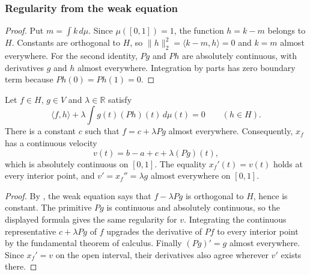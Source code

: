\subsubsection{Regularity from the weak equation}
\label{sec:variational-regularity}

\begin{proof}
Put $m=\int k\,d\mu$. Since $\mu([0,1])=1$, the function
$h=k-m$ belongs to $H$. Constants are orthogonal to $H$, so
$\lVert h\rVert_2^2=\langle k-m,h\rangle=0$ and $k=m$
almost everywhere. For the second identity, $Pg$ and $Ph$ are
absolutely continuous, with derivatives $g$ and $h$ almost
everywhere. Integration by parts has zero boundary term because
$Ph(0)=Ph(1)=0$.
\end{proof}

\begin{theorem}
\label{thm:variational-regularity}
Let $f\in H$, $g\in V$ and $\lambda\in\mathbb R$ satisfy
\[
 \langle f,h\rangle+\lambda\int g(t)(Ph)(t)\,d\mu(t)=0
 \qquad(h\in H).
\]
There is a constant $c$ such that $f=c+\lambda Pg$ almost
everywhere. Consequently, $x_f$ has a continuous velocity
\[
 v(t)=b-a+c+\lambda(Pg)(t),
\]
which is absolutely continuous on $[0,1]$. The equality
$x_f'(t)=v(t)$ holds at every interior point, and
$v'=x_f''=\lambda g$ almost everywhere on $[0,1]$.
\end{theorem}
\begin{proof}
By , the weak equation says
that $f-\lambda Pg$ is orthogonal to $H$, hence is constant.
The primitive $Pg$ is continuous and absolutely continuous, so
the displayed formula gives the same regularity for $v$.
Integrating the continuous representative $c+\lambda Pg$ of $f$
upgrades the derivative of $Pf$ to every interior point by the
fundamental theorem of calculus. Finally $(Pg)'=g$ almost
everywhere. Since $x_f'=v$ on the open interval, their derivatives
also agree wherever $v'$ exists there.
\end{proof}
